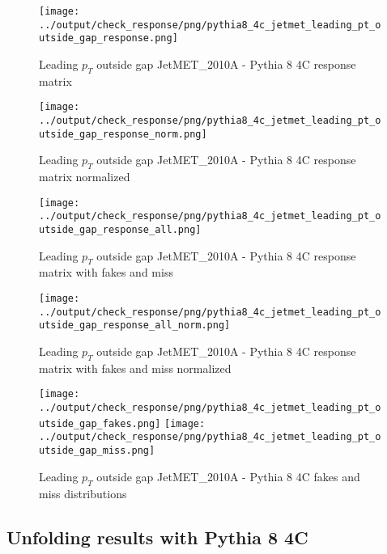 \documentclass[11pt]{book}
\begin{document}
\begin{figure}[ht]
\centering
\texttt{[image: ../output/check\_response/png/pythia8\_4c\_jetmet\_leading\_pt\_outside\_gap\_response.png]}
\caption{Leading $p_{T}$ outside gap JetMET\_2010A - Pythia 8 4C response matrix}
\label{p8_jetmet_leading_pt_outside_gap_response}
\end{figure}

\begin{figure}[ht]
\centering
\texttt{[image: ../output/check\_response/png/pythia8\_4c\_jetmet\_leading\_pt\_outside\_gap\_response\_norm.png]}
\caption{Leading $p_{T}$ outside gap JetMET\_2010A - Pythia 8 4C response matrix normalized}
\label{p8_jetmet_leading_pt_outside_gap_response_norm}
\end{figure}

\begin{figure}[ht]
\centering
\texttt{[image: ../output/check\_response/png/pythia8\_4c\_jetmet\_leading\_pt\_outside\_gap\_response\_all.png]}
\caption{Leading $p_{T}$ outside gap JetMET\_2010A - Pythia 8 4C response matrix with fakes and miss}
\label{p8_jetmet_leading_pt_outside_gap_response_all}
\end{figure}

\begin{figure}[ht]
\centering
\texttt{[image: ../output/check\_response/png/pythia8\_4c\_jetmet\_leading\_pt\_outside\_gap\_response\_all\_norm.png]}
\caption{Leading $p_{T}$ outside gap JetMET\_2010A - Pythia 8 4C response matrix with fakes and miss normalized}
\label{p8_jetmet_leading_pt_outside_gap_response_all_norm}
\end{figure}

\begin{figure}[ht]
\centering
\texttt{[image: ../output/check\_response/png/pythia8\_4c\_jetmet\_leading\_pt\_outside\_gap\_fakes.png]}
\texttt{[image: ../output/check\_response/png/pythia8\_4c\_jetmet\_leading\_pt\_outside\_gap\_miss.png]}
\caption{Leading $p_{T}$ outside gap JetMET\_2010A - Pythia 8 4C fakes and miss distributions}
\label{p8_jetmet_leading_pt_outside_gap_fakesmiss}
\end{figure}


\clearpage
\subsection{Unfolding results with Pythia 8 4C}
\end{document}
